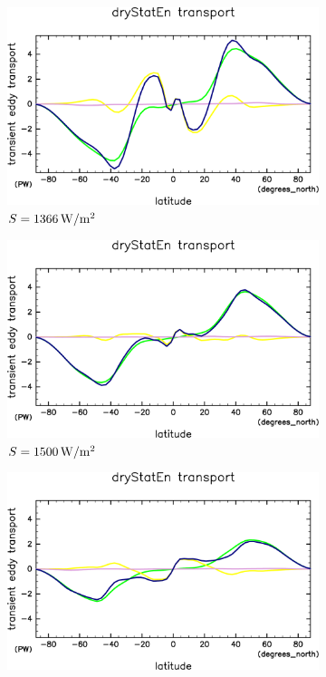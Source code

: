 \documentclass[body]{subfiles}
\begin{document}
\begin{figure}[t]
	\centering
	\begin{subfigure}{.4\textwidth}
		\centering
		\includegraphics[width=\columnwidth]{S1366/MeriHeatTrans@dryStatEn,time=14600:14965-crop-rotate.pdf}
		\caption{\(S=1366\hmu{W/m^2}\)}
	\end{subfigure}
	\begin{subfigure}{.4\textwidth}
		\centering
		\includegraphics[width=\columnwidth]{S1500/MeriHeatTrans@dryStatEn,time=3650:4015-crop-rotate.pdf}
		\caption{\(S=1500\hmu{W/m^2}\)}
	\end{subfigure}
	\begin{subfigure}{.4\textwidth}
		\centering
		\includegraphics[width=\columnwidth]{S1600/MeriHeatTrans@dryStatEn,time=3650:4015-crop-rotate.pdf}

\end{subfigure}
\end{figure}
\end{document}
